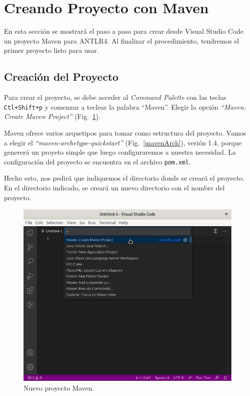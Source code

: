 \section{Creando Proyecto con Maven}
\label{proyMaven}

En esta sección se mostrará el paso a paso para crear desde Visual Studio Code un proyecto Maven para ANTLR4.  Al finalizar el procedimiento, tendremos el primer proyecto listo para usar.

\subsection{Creación del Proyecto}
\label{creacionProy}

Para crear el proyecto, se debe acceder al \emph{Command Palette} con las teclas \verb|Ctl+Shift+p| y comenzar a teclear la palabra ``Maven''. Elegir la opción \emph{``Maven: Create Maven Project''} (Fig.~\ref{mavenNuevo}).

Maven ofrece varios arquetipos para tomar como estructura del proyecto.  Vamos a elegir el \emph{``maven-archetype-quickstart''} (Fig.~\ref{mavenArch}), verión 1.4, porque genererá un proyeto simple que luego configuraremos a nuestra necesidad.  La configuración del proyecto se encuentra en el archivo \verb|pom.xml|.

Hecho esto, nos pedirá que indiquemos el directorio donde se creará el proyecto.  En el directorio indicado, se creará un nuevo directorio con el nombre del proyecto.

\begin{figure}[t]
	\centering
	\includegraphics[width=.95\textwidth]{img/CrearMavenProject}
	\caption{Nuevo proyecto Maven.}
	\label{mavenNuevo}
\end{figure}

